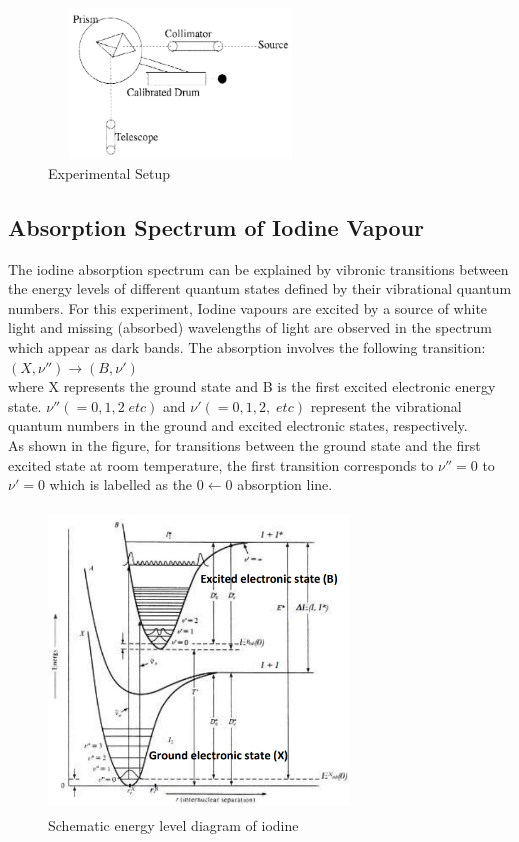 \begin{figure}[H]
\includegraphics[height=4cm, width=7cm]{images/3.png}
\caption{Experimental Setup}
\label{fig:2}
\end{figure}

\subsection{Absorption Spectrum of Iodine Vapour}
The iodine absorption spectrum can be explained by vibronic transitions between the energy levels of different quantum states defined by their vibrational quantum numbers. For this experiment, Iodine vapours are excited by a source of white light and missing (absorbed) wavelengths of light are observed in the spectrum which appear as dark bands. The absorption involves the following transition: $(X, \nu'') \rightarrow (B, \nu')$\\
where X represents the ground state and B is the first excited electronic energy state. $\nu'' (=0, 1, 2\; etc)$ and $\nu' (=0,1,2,\; etc)$ represent the vibrational quantum numbers in the ground and excited electronic states, respectively.\\
As shown in the figure, for transitions between the ground state and the first excited state at room temperature, the first transition corresponds to $\nu'' =0$ to $\nu' = 0$ which is labelled as the $0\leftarrow0$ absorption line.\\

\begin{figure}[H]
\includegraphics[height=8cm, width=8cm]{images/4.png}
\caption{Schematic energy level diagram of iodine}
\label{fig3}
\end{figure}

